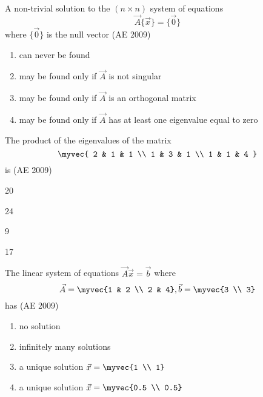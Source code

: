 \item 
A non-trivial solution to the \( (n \times n) \) system of equations 
\[
\vec{A}\{\vec{x}\} = \{\vec{0}\}
\]
where \( \{\vec{0}\} \) is the null vector
\hfill(AE 2009)
\begin{enumerate}
\item can never be found
\item may be found only if \(\vec{A}\) is not singular
\item may be found only if \(\vec{A}\) is an orthogonal matrix
\item may be found only if \(\vec{A}\) has at least one eigenvalue equal to zero
\end{enumerate}
\item The product of the eigenvalues of the matrix
\[
\myvec{
2 & 1 & 1 \\
1 & 3 & 1 \\
1 & 1 & 4
}
\]
is
\hfill(AE 2009)
\begin{enumerate}
\begin{multicols}{4}
\item 20
\item 24
\item 9
\item 17    
\end{multicols}
\end{enumerate}
\item The linear system of equations $\vec{A} \vec{x} = \vec{b}$ where
\[
\vec{A} = \myvec{1 & 2 \\ 2 & 4}, \vec{b} = \myvec{3 \\ 3}
\]
has
\hfill(AE 2009)
\begin{enumerate}
\item no solution
\item infinitely many solutions
\item a unique solution $\vec{x} = \myvec{1 \\ 1}$
\item a unique solution $\vec{x} = \myvec{0.5 \\ 0.5}$
\end{enumerate}

